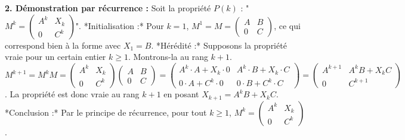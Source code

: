 \documentclass{report}
\begin{document}
\textbf{2. Démonstration par récurrence :}
Soit la propriété $P(k)$ : "$M^k = \begin{pmatrix} A^k & X_k \\ 0 & C^k \end{pmatrix}$".
*Initialisation :* Pour $k=1$, $M^1 = M = \begin{pmatrix} A & B \\ 0 & C \end{pmatrix}$, ce qui correspond bien à la forme avec $X_1 = B$.
*Hérédité :* Supposons la propriété vraie pour un certain entier $k \ge 1$.
Montrons-la au rang $k+1$.
$M^{k+1} = M^k M = \begin{pmatrix} A^k & X_k \\ 0 & C^k \end{pmatrix} \begin{pmatrix} A & B \\ 0 & C \end{pmatrix} = \begin{pmatrix} A^k \cdot A + X_k \cdot 0 & A^k \cdot B + X_k \cdot C \\ 0 \cdot A + C^k \cdot 0 & 0 \cdot B + C^k \cdot C \end{pmatrix} = \begin{pmatrix} A^{k+1} & A^kB + X_k C \\ 0 & C^{k+1} \end{pmatrix}$.
La propriété est donc vraie au rang $k+1$ en posant $X_{k+1} = A^k B + X_k C$.
*Conclusion :* Par le principe de récurrence, pour tout $k \ge 1$, $M^k = \begin{pmatrix} A^k & X_k \\ 0 & C^k \end{pmatrix}$.
\end{document}
